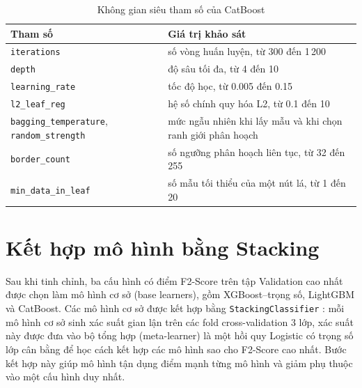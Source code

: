 \begin{table}[H]
\centering
\fontsize{11}{13.6}\selectfont
\renewcommand{\arraystretch}{1.2}
\setlength{\tabcolsep}{6pt}
\begin{tabularx}{\textwidth}{|p{4.8cm}|X|}
\hline
\textbf{Tham số} & \textbf{Giá trị khảo sát} \\
\hline
\texttt{iterations} & số vòng huấn luyện, từ 300 đến 1\,200 \\
\hline
\texttt{depth} & độ sâu tối đa, từ 4 đến 10 \\
\hline
\texttt{learning\_rate} & tốc độ học, từ 0{.}005 đến 0{.}15 \\
\hline
\texttt{l2\_leaf\_reg} & hệ số chính quy hóa L2, từ 0{.}1 đến 10 \\
\hline
\texttt{bagging\_temperature}, \texttt{random\_strength} & mức ngẫu nhiên khi lấy mẫu và khi chọn ranh giới phân hoạch \\
\hline
\texttt{border\_count} & số ngưỡng phân hoạch liên tục, từ 32 đến 255 \\
\hline
\texttt{min\_data\_in\_leaf} & số mẫu tối thiểu của một nút lá, từ 1 đến 20 \\
\hline
\end{tabularx}
\caption{Không gian siêu tham số của CatBoost}
\label{tab:cat_params}
\end{table}

\section{Kết hợp mô hình bằng Stacking}
Sau khi tinh chỉnh, ba cấu hình có điểm F2-Score trên tập Validation cao nhất được chọn làm mô hình cơ sở (base learners), gồm XGBoost--trọng số, LightGBM và CatBoost. Các mô hình cơ sở được kết hợp bằng \texttt{StackingClassifier} \cite{wolpert1992stacked}: mỗi mô hình cơ sở sinh xác suất gian lận trên các fold cross-validation 3 lớp, xác suất này được đưa vào bộ tổng hợp (meta-learner) là một hồi quy Logistic có trọng số lớp cân bằng để học cách kết hợp các mô hình sao cho F2-Score cao nhất. Bước kết hợp này giúp mô hình tận dụng điểm mạnh từng mô hình và giảm phụ thuộc vào một cấu hình duy nhất.

